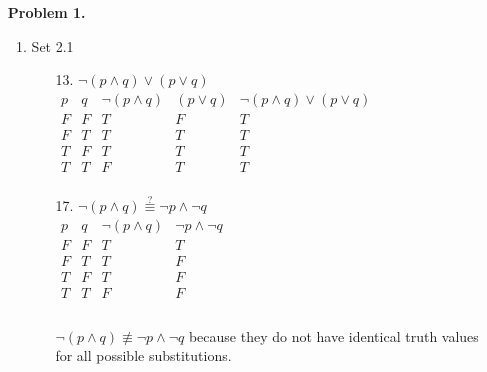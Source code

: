 \documentclass[letterpaper]{article}
\begin{document}
	\begin{enumerate} 
		\item [] \textbf{Problem 1.}
		\begin{enumerate}
			\item Set 2.1 
			\begin{itemize}
				\item [13.] 
				$\neg \left( p \wedge q \right) \vee \left( p \vee q \right)$ \\
				$\begin{array}{c|c|c|c|c}
					p & q & \neg \left( p \wedge q \right) & \left( p \vee q \right) & \neg \left( p \wedge q \right) \vee \left( p \vee q \right) \\ \hline
					F & F & T & F & T \\ \hline
					F & T & T & T & T \\ \hline
					T & F & T & T & T \\ \hline
					T & T & F & T & T \\ 
				\end{array}$
				\item [17.]
				$\neg \left( p \wedge q \right) \stackrel{?}{\equiv} \neg p \wedge \neg q$ \\
				$\begin{array}{c|c|c|c}
					p & q & \neg \left( p \wedge q \right) & \neg p \wedge \neg q \\ \hline
					F & F & T & T \\ \hline
					F & T & T & F \\ \hline
					T & F & T & F \\ \hline
					T & T & F & F \\ 
				\end{array}$ \\
				\\
				$\neg \left( p \wedge q \right) \not\equiv \neg p \wedge \neg q$ because they do not have identical truth values for all possible substitutions.
			\end{itemize}
			

\end{enumerate}
\end{enumerate}
\end{document}
